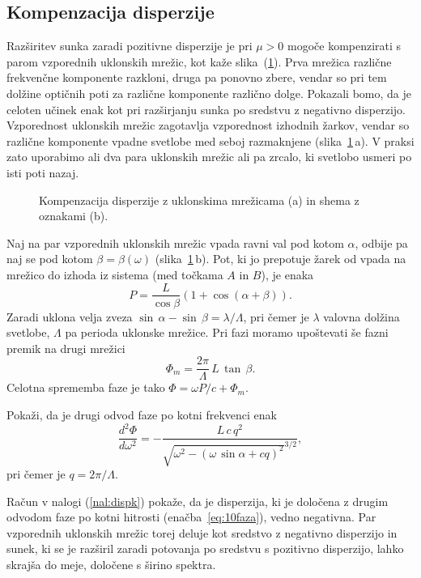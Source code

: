 \subsection*{Kompenzacija disperzije}
Razširitev sunka zaradi pozitivne disperzije je pri $\mu > 0$ mogoče kompenzirati
s parom vzporednih uklonskih mrežic, kot kaže slika~(\ref{fig:comp}).
Prva mrežica različne frekvenčne komponente razkloni, druga pa ponovno
zbere, vendar so pri tem dolžine optičnih poti za različne komponente različno dolge.
Pokazali bomo, da je celoten učinek enak kot pri razširjanju sunka po sredstvu z negativno
disperzijo. Vzporednost uklonskih mrežic zagotavlja vzporednost izhodnih žarkov,
vendar so različne komponente vpadne svetlobe med seboj razmaknjene (slika~\ref{fig:comp}\,a).
V praksi zato uporabimo ali dva para uklonskih mrežic ali pa 
zrcalo, ki svetlobo usmeri po isti poti nazaj. 
\begin{figure}[h]
\centering
\def\svgwidth{120truemm} 

\caption{Kompenzacija disperzije z uklonskima mrežicama (a) in shema z
oznakami (b).}
\label{fig:comp}
\end{figure}

Naj na par vzporednih uklonskih mrežic vpada ravni val pod kotom $\alpha$, odbije
pa naj se pod kotom $\beta = \beta(\omega)$ (slika~\ref{fig:comp}\,b). 
Pot, ki jo prepotuje žarek od vpada na mrežico 
do izhoda iz sistema (med točkama $A$ in $B$), je enaka 
\begin{equation}
P = \frac{L}{\cos\beta} \left(1+\cos(\alpha + \beta)\right).
\end{equation}
Zaradi uklona velja zveza $\sin\,\alpha - \sin\,\beta = \lambda/\Lambda$,
pri čemer je $\lambda$ valovna dolžina svetlobe, $\Lambda$ pa perioda uklonske mrežice. 
Pri fazi moramo upoštevati še fazni premik na drugi mrežici
\begin{equation}
\Phi_m=\frac{2\pi}{\Lambda} \, L \, \tan\,\beta.
\end{equation}
Celotna sprememba faze je tako $\Phi = \omega P/c + \Phi_m$.

\begin{definition}
\label{nal:dispk}
Pokaži, da je drugi odvod faze po kotni frekvenci enak
\begin{equation}
\frac{d^2 \Phi}{d \omega^2} = - \frac{L\, c\, q^2}
{\sqrt{\omega^2 - (\omega\, \sin\alpha + cq)^2}^{3/2}},
\label{eq:10faza}
\end{equation}
pri čemer je $q = 2 \pi/\Lambda$.
\end{definition}
Račun v nalogi (\ref{nal:dispk})
pokaže, da je disperzija, ki je določena z drugim odvodom faze po kotni hitrosti 
(enačba~\ref{eq:10faza}), vedno negativna. Par vzporednih uklonskih mrežic
torej deluje kot sredstvo
z negativno disperzijo in sunek, ki se je razširil zaradi potovanja
po sredstvu s pozitivno disperzijo, lahko skrajša do meje,
določene s širino spektra. 

